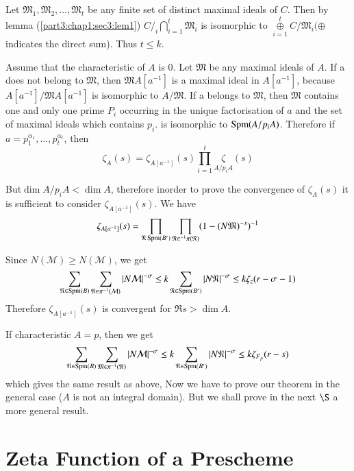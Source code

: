 Let $\mathfrak{M}_1,\mathfrak{M}_2,\ldots, \mathfrak{M}_t$ be any finite
set of distinct maximal ideals of $C$. Then by lemma
(\ref{part3:chap1:sec3:lem1}) $C/_i
\bigcap\limits^{t}_{i = 1} \mathfrak{M}_i$ is isomorphic to $
\overset{t}{\underset{i=1}{\oplus}} C/\mathfrak{M}_i (\oplus$ indicates
the direct sum). Thus $t \leq k$. 

Assume that the characteristic of $A$ is $0$. Let $\mathfrak{M}$ be any
maximal ideals of $A$. If a does not belong to $\mathfrak{M}$, then
$\mathfrak{M}A[a^{-1}]$ is a maximal ideal in $A[a^{-1}]$, because
$A[a^{-1}]/ \mathfrak{M}A[a^{-1}]$ is isomorphic to $A/\mathfrak{M}$. If
a belongs to $\mathfrak{M}$, then $\mathfrak{M}$ contains one and only
one prime $P_i$ occurring in the unique factorisation of $a$ and the
set of maximal ideals which contains $p_i$. is isomorphic to
$\operatorname{Spm} (A/p_i A)$. Therefore if
$a=p_1^{\alpha_1},\ldots, p_t^{\alpha_t}$, then 
$$
\zeta_A (s) =\zeta_{A[a^{-1}]} (s) \prod_{i=1}^{t} \underset{A/p_i
  A}\zeta(s) 
$$

But\pageoriginale $\dim A/p_i A< \dim A$, therefore inorder to prove the convergence
of $\zeta_{A}(s)$ it is sufficient to consider
$\zeta_{A[a^{-1}]}(s)$. We have 
$$
\zeta_{A [ a^{-1} ] } (s) =\prod_{\mathfrak{N} \operatorname{Spm}(B')} \prod
_{\mathfrak{N}\in^{-1}\pi(\mathfrak{N})} (1-(N \mathfrak{M})^{-s})^{-1} 
$$

Since $N(\mathcal{M})\geq N(\mathcal{M})$, we get
$$
\sum_{\mathfrak{N} \in \operatorname{Spm} (B)} \sum_{\mathfrak{N}\in
  \pi^{-1}(\mathcal{M})}|N \mathcal{M}|^{-\sigma}\leq k
\sum_{\mathfrak{N}\in \operatorname{Spm}(B')}|N \mathfrak{N}|^{-\sigma} \leq k
\zeta_z (r-\sigma-1) 
$$
Therefore $\zeta_{A[a^{-1}]}(s)$ is convergent for $\Re s > \dim A$.

If characteristic $A=p$, then we get
$$
\sum_{\mathfrak{N} \in \operatorname{Spm} (B)} \sum_{\mathfrak{M}\in
  \pi^{-1}(\mathfrak{N})} |N \mathcal{M}|^{-\sigma} \leq k
\sum_{\mathfrak{N}\in \operatorname{Spm} (B')} |N \mathfrak{N}|^{-\sigma} \leq k
\zeta_{F_p}(r-s) 
$$
which gives the same result as above, Now we have to prove our theorem
in the general case ($A$ is not an integral domain). But we shall prove
in the next $\S$ a more general result. 

\section{Zeta Function of a Prescheme}\label{part3:chap2:sec4}

